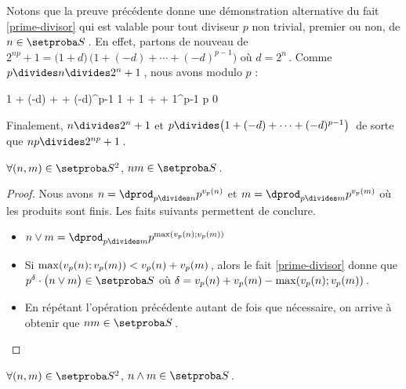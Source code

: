 Notons que la preuve précédente donne une démonstration alternative du fait \ref{prime-divisor} qui est valable pour tout diviseur $p$ non trivial, premier ou non, de $n \in \ourset$\,.
En effet,
partons de nouveau de $2^{np} + 1 = \big( 1 + d \big) \, \big( 1 + (-d) + \cdots + (-d)^{p-1}  \big)$ où $d = 2^n$\,.
Comme $p \divides n \divides 2^n + 1$\,, nous avons modulo $p$ :

\medskip

\begin{stepcalc}[style = ar*, ope = \equiv]
	1 + (-d) + \cdots + (-d)^{p-1} 
	1 + 1 + \cdots + 1^{p-1} 
\explnext{}
	p
\explnext{}
	0
\end{stepcalc}

\medskip 

Finalement,
$n \divides 2^n + 1$ et $p \divides \big( 1 + (-d) + \cdots + (-d)^{p-1}  \big)$\, de sorte que $n p \divides 2^{n p} + 1$\,.




\begin{fact} \label{product}
	$\forall (n , m) \in \ourset^2$, $n m \in \ourset$\,.
\end{fact}

\begin{proof}
	Nous avons
	$n = \dprod_{p \divides n} p^{\padicval{n}}$
	et
	$m = \dprod_{p \divides m} p^{\padicval{m}}$
	où les produits sont finis.
	Les faits suivants permettent de conclure.
%
	\begin{itemize}
		\item $n \vee m = \dprod_{p \divides m} p^{\max ( \padicval{n} ; \padicval{m} )}$

		\item Si $\max ( \padicval{n} ; \padicval{m} ) < \padicval{n} + \padicval{m}$\,, alors le fait \ref{prime-divisor} donne que $p^\delta \cdot \big( n \vee m \big) \in \ourset$ où $\delta = \padicval{n} + \padicval{m} - \max ( \padicval{n} ; \padicval{m} )$\,.

		\item En répétant l'opération précédente autant de fois que nécessaire, on arrive à obtenir que $n m \in \ourset$\,.
	\end{itemize}
\end{proof}




\begin{fact} \label{gcd}
	$\forall (n , m) \in \ourset^2$, $n \wedge m \in \ourset$\,.
\end{fact}

